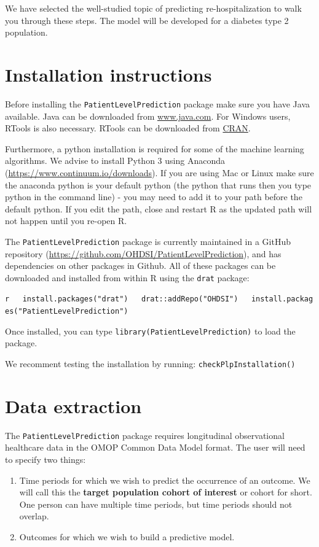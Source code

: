\documentclass[]{article}
\begin{document}
We have selected the well-studied topic of predicting re-hospitalization
to walk you through these steps. The model will be developed for a
diabetes type 2 population.

\section{Installation instructions}\label{installation-instructions}

Before installing the \texttt{PatientLevelPrediction} package make sure
you have Java available. Java can be downloaded from
\href{http://www.java.com}{www.java.com}. For Windows users, RTools is
also necessary. RTools can be downloaded from
\href{http://cran.r-project.org/bin/windows/Rtools/}{CRAN}.

Furthermore, a python installation is required for some of the machine
learning algorithms. We advise to install Python 3 using Anaconda
(\url{https://www.continuum.io/downloads}). If you are using Mac or
Linux make sure the anaconda python is your default python (the python
that runs then you type python in the command line) - you may need to
add it to your path before the default python. If you edit the path,
close and restart R as the updated path will not happen until you
re-open R.

The \texttt{PatientLevelPrediction} package is currently maintained in a
GitHub repository
(\url{https://github.com/OHDSI/PatientLevelPrediction}), and has
dependencies on other packages in Github. All of these packages can be
downloaded and installed from within R using the \texttt{drat} package:

\texttt{r\ \ \ install.packages("drat")\ \ \ drat::addRepo("OHDSI")\ \ \ install.packages("PatientLevelPrediction")}

Once installed, you can type \texttt{library(PatientLevelPrediction)} to
load the package.

We recomment testing the installation by running:
\texttt{checkPlpInstallation()}

\section{Data extraction}\label{data-extraction}

The \texttt{PatientLevelPrediction} package requires longitudinal
observational healthcare data in the OMOP Common Data Model format. The
user will need to specify two things:

\begin{enumerate}
\def\labelenumi{\arabic{enumi}.}
\item
  Time periods for which we wish to predict the occurrence of an
  outcome. We will call this the \textbf{target population cohort of
  interest} or cohort for short. One person can have multiple time
  periods, but time periods should not overlap.
\item
  Outcomes for which we wish to build a predictive model.
\end{enumerate}
\end{document}
